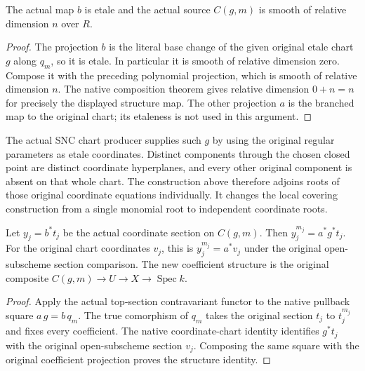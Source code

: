 \begin{lemma}
\label{lem:kn-nadel-kummer-pullback-smooth}
\leanok
{}
The actual map $b$ is etale and the actual source $C(g,m)$ is smooth
of relative dimension $n$ over $R$.
\end{lemma}
\begin{proof}
The projection $b$ is the literal base change of the given original
etale chart $g$ along $q_m$, so it is etale.  In particular it is smooth
of relative dimension zero.  Compose it with the preceding polynomial
projection, which is smooth of relative dimension $n$.  The native
composition theorem gives relative dimension $0+n=n$ for precisely
the displayed structure map.  The other projection $a$ is the branched
map to the original chart; its etaleness is not used in this argument.
\end{proof}

The actual SNC chart producer supplies such $g$ by using the original
regular parameters as etale coordinates.  Distinct components through
the chosen closed point are distinct coordinate hyperplanes, and every
other original component is absent on that whole chart.  The
construction above therefore adjoins roots of those original coordinate
equations individually.  It changes the local covering construction
from a single monomial root to independent coordinate roots.

\begin{lemma}
\label{lem:kn-nadel-kummer-original-roots}
\leanok
{}
Let $y_j=b^*t_j$ be the actual coordinate section on $C(g,m)$.
Then $y_j^{m_j}=a^*g^*t_j$.  For the original chart coordinates $v_j$,
this is $y_j^{m_j}=a^*v_j$ under the original open-subscheme section
comparison.  The new coefficient structure is the original composite
$C(g,m)\to U\to X\to\operatorname{Spec}k$.
\end{lemma}
\begin{proof}
Apply the actual top-section contravariant functor to the native
pullback square $a\,g=b\,q_m$.  The true comorphism of $q_m$ takes
the original section $t_j$ to $t_j^{m_j}$ and fixes every coefficient.
The native coordinate-chart identity identifies $g^*t_j$ with the
original open-subscheme section $v_j$.  Composing the same square
with the original coefficient projection proves the structure identity.
\end{proof}

